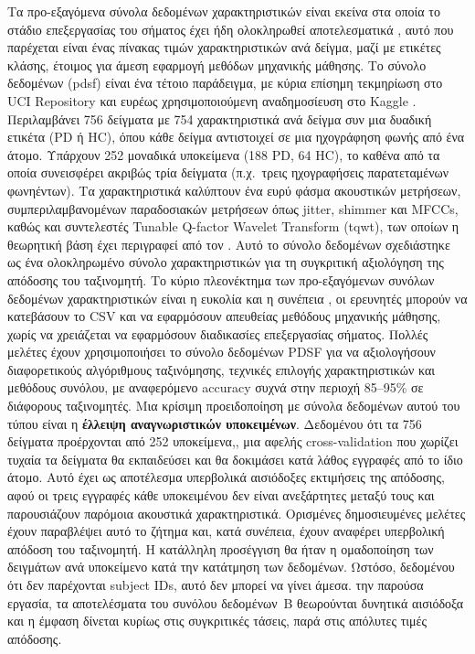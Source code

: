 Τα προ-εξαγόμενα σύνολα δεδομένων χαρακτηριστικών είναι εκείνα στα οποία το στάδιο επεξεργασίας του σήματος έχει ήδη ολοκληρωθεί αποτελεσματικά , αυτό που παρέχεται είναι ένας πίνακας τιμών χαρακτηριστικών ανά δείγμα, μαζί με ετικέτες κλάσης, έτοιμος για άμεση εφαρμογή μεθόδων μηχανικής μάθησης. 
Το σύνολο δεδομένων (\gls{pdsf}) είναι ένα τέτοιο παράδειγμα, με κύρια επίσημη τεκμηρίωση στο UCI Repository και ευρέως χρησιμοποιούμενη αναδημοσίευση στο Kaggle \citep{uci2018pd_classification,pd_speech_features_kaggle}. Περιλαμβάνει 756 δείγματα με 754 χαρακτηριστικά ανά δείγμα συν μια δυαδική ετικέτα (PD ή HC), όπου κάθε δείγμα αντιστοιχεί σε μια ηχογράφηση φωνής από ένα άτομο. Υπάρχουν 252 μοναδικά υποκείμενα (188 PD, 64 HC), το καθένα από τα οποία συνεισφέρει ακριβώς τρία δείγματα (π.χ.\ τρεις ηχογραφήσεις παρατεταμένων φωνηέντων). Τα χαρακτηριστικά καλύπτουν ένα ευρύ φάσμα ακουστικών μετρήσεων, συμπεριλαμβανομένων παραδοσιακών μετρήσεων όπως \gls{jitter}, \gls{shimmer} και MFCCs, καθώς και συντελεστές Tunable Q-factor Wavelet Transform (\gls{tqwt}), των οποίων η θεωρητική βάση έχει περιγραφεί από τον \citet{selesnick2011tqwt}. Αυτό το σύνολο δεδομένων σχεδιάστηκε ως ένα ολοκληρωμένο σύνολο χαρακτηριστικών για τη συγκριτική αξιολόγηση της απόδοσης του ταξινομητή.
Το κύριο πλεονέκτημα των προ-εξαγόμενων συνόλων δεδομένων χαρακτηριστικών είναι η ευκολία και η συνέπεια , οι ερευνητές μπορούν να κατεβάσουν το CSV και να εφαρμόσουν απευθείας μεθόδους μηχανικής μάθησης, χωρίς να χρειάζεται να εφαρμόσουν διαδικασίες επεξεργασίας σήματος. Πολλές μελέτες έχουν χρησιμοποιήσει το σύνολο δεδομένων PDSF για να αξιολογήσουν διαφορετικούς αλγόριθμους ταξινόμησης, τεχνικές επιλογής χαρακτηριστικών και μεθόδους συνόλου, με αναφερόμενο accuracy συχνά στην περιοχή 85--95\% σε διάφορους ταξινομητές.
Μια κρίσιμη προειδοποίηση με σύνολα δεδομένων αυτού του τύπου είναι η \textbf{έλλειψη αναγνωριστικών υποκειμένων}. 
Δεδομένου ότι τα 756 δείγματα προέρχονται από 252 υποκείμενα,, μια αφελής cross-validation που χωρίζει τυχαία τα δείγματα 
θα εκπαιδεύσει και θα δοκιμάσει κατά λάθος εγγραφές από το ίδιο άτομο. 
Αυτό έχει ως αποτέλεσμα υπερβολικά αισιόδοξες εκτιμήσεις της απόδοσης, αφού οι τρεις εγγραφές κάθε υποκειμένου δεν είναι ανεξάρτητες μεταξύ τους και παρουσιάζουν παρόμοια ακουστικά χαρακτηριστικά.
Ορισμένες δημοσιευμένες μελέτες έχουν παραβλέψει αυτό το ζήτημα και, κατά συνέπεια, έχουν αναφέρει υπερβολική απόδοση του ταξινομητή. Η κατάλληλη προσέγγιση θα ήταν η ομαδοποίηση των δειγμάτων ανά υποκείμενο κατά την κατάτμηση των δεδομένων. 
Ωστόσο, δεδομένου ότι δεν παρέχονται subject IDs, αυτό δεν μπορεί να γίνει άμεσα. 
την παρούσα εργασία, τα αποτελέσματα του συνόλου δεδομένων~B θεωρούνται δυνητικά αισιόδοξα και η έμφαση δίνεται κυρίως στις συγκριτικές τάσεις, παρά στις απόλυτες τιμές απόδοσης.

